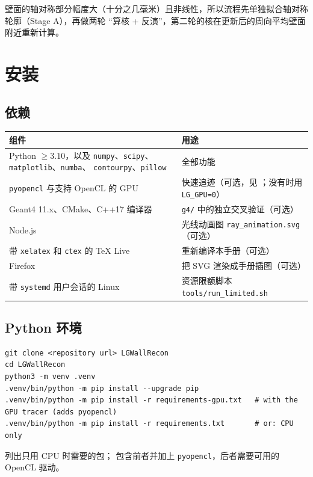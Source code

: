 \documentclass[11pt,a4paper,fontset=fandol]{ctexart}
\newcommand{\code}[1]{\texttt{#1}}
\begin{document}
壁面的轴对称部分幅度大（十分之几毫米）且非线性，所以流程先单独拟合轴对称轮廓（Stage A），再做两轮
“算核 + 反演”，第二轮的核在更新后的周向平均壁面附近重新计算。

\section{安装}

\subsection{依赖}

\begin{tabularx}{\textwidth}{@{}L{4.6cm}Y@{}}
\toprule
组件 & 用途 \\
\midrule
Python $\ge 3.10$，以及 \code{numpy}、\code{scipy}、\code{matplotlib}、\code{numba}、
\code{contourpy}、\code{pillow} & 全部功能 \\
\code{pyopencl} 与支持 OpenCL 的 GPU & 快速追迹（可选，见 ；没有时用 \code{LG\_GPU=0}） \\
Geant4 11.x、CMake、C++17 编译器 & \code{g4/} 中的独立交叉验证（可选） \\
Node.js & 光线动画图 \code{ray\_animation.svg}（可选） \\
带 \code{xelatex} 和 \code{ctex} 的 TeX Live & 重新编译本手册（可选） \\
Firefox & 把 SVG 渲染成手册插图（可选） \\
带 \code{systemd} 用户会话的 Linux & 资源限额脚本 \code{tools/run\_limited.sh} \\
\bottomrule
\end{tabularx}

\subsection{Python 环境}

\begin{lstlisting}
git clone <repository url> LGWallRecon
cd LGWallRecon
python3 -m venv .venv
.venv/bin/python -m pip install --upgrade pip
.venv/bin/python -m pip install -r requirements-gpu.txt   # with the GPU tracer (adds pyopencl)
.venv/bin/python -m pip install -r requirements.txt       # or: CPU only
\end{lstlisting}
 列出只用 CPU 时需要的包； 包含前者并加上
\code{pyopencl}，后者需要可用的 OpenCL 驱动。
\end{document}
